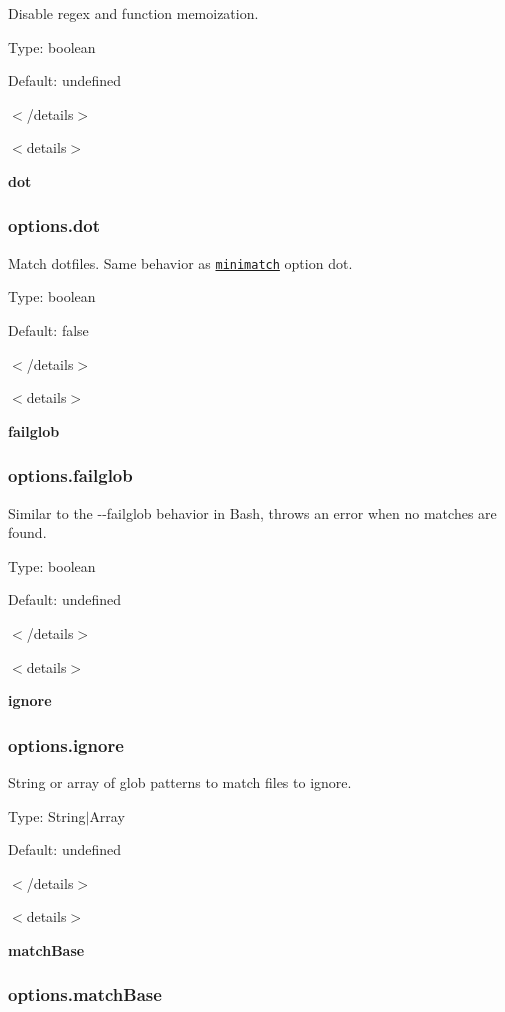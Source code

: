 Disable regex and function memoization.

Type\+: {\ttfamily boolean}

Default\+: {\ttfamily undefined}

$<$/details$>$

$<$details$>$ 

{\bfseries dot}

\subsubsection*{options.\+dot}

Match dotfiles. Same behavior as \href{https://github.com/isaacs/minimatch}{\tt minimatch} option {\ttfamily dot}.

Type\+: {\ttfamily boolean}

Default\+: {\ttfamily false}

$<$/details$>$

$<$details$>$ 

{\bfseries failglob}

\subsubsection*{options.\+failglob}

Similar to the {\ttfamily -\/-\/failglob} behavior in Bash, throws an error when no matches are found.

Type\+: {\ttfamily boolean}

Default\+: {\ttfamily undefined}

$<$/details$>$

$<$details$>$ 

{\bfseries ignore}

\subsubsection*{options.\+ignore}

String or array of glob patterns to match files to ignore.

Type\+: {\ttfamily String$\vert$\+Array}

Default\+: {\ttfamily undefined}

$<$/details$>$

$<$details$>$ 

{\bfseries match\+Base}

\subsubsection*{options.\+match\+Base}

